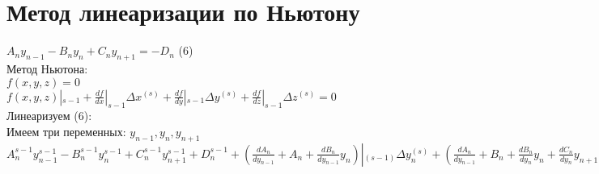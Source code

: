 \section{Метод линеаризации по Ньютону}
$A_n y_{n-1} - B_n y_n + C_n y_{n+1} = -D_{n}$ (6)\\
Метод Ньютона:\\
$f(x, y, z) = 0$\\
$f(x, y, z)|_{s-1} + \frac{df}{dx}|_{s-1}\Delta x^{(s)} +  \frac{df}{dy}|_{s-1}\Delta y^{(s)} +  \frac{df}{dz}|_{s-1}\Delta z^{(s)} = 0$\\
Линеаризуем (6):\\
Имеем три переменных: $y_{n-1}, y_n, y_{n+1}$\\
$A_n^{s-1} y_{n-1}^{s-1} - B_n^{s-1} y_n^{s-1} + C_n^{s-1} y_{n+1}^{s-1} + D_{n}^{s-1} + (\frac{d A_n}{d y_{n-1}} + A_n + \frac{d B_n}{d y_{n-1}} y_n)|_{(s-1)}\Delta y_{n}^{(s)} + (\frac{d A_n}{d y_{n-1}} + B_n + \frac{d B_n}{d y_{n}} y_n + \frac{d C_n}{d y_n}y_{n+1} + \frac{d D_n}{d y_n})|_{(s-1)}\Delta y_{n}^{(s)} + (\frac{d A_n}{d y_{n-1}} + C_n + \frac{d C_n}{d y_{n+1}} y_{n+1})|_{(s-1)}\Delta y_{n+1}^{(s)} = 0$